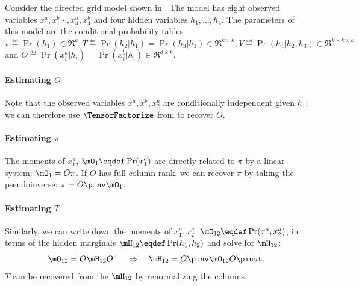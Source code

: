 Consider the directed grid model shown in .
The model has eight observed variables $x^a_1, x^b_1 \cdots, x^a_4, x^b_4$ and four
  hidden variables $h_1, \ldots, h_4$.
The parameters of this model are the conditional probability tables
$\pi \eqdef \Pr(h_1) \in \Re^k, T \eqdef \Pr(h_2 | h_1) = \Pr(h_3 | h_1) \in \Re^{k \times k},
V \eqdef \Pr(h_4 | h_2, h_3) \in \Re^{k \times k \times k}$ and $O \eqdef \Pr(x^a_i | h_i)
=  \Pr(x^b_i | h_i) \in \Re^{d \times k}$. 

\paragraph{Estimating $O$}
Note that the observed variables $x^a_1, x^b_1, x^a_2$ are
  conditionally independent given $h_1$; we can therefore use
  $\TensorFactorize$ from  to recover $O$.

\paragraph{Estimating $\pi$}
The moments of $x^a_1$, $\mO_1 \eqdef \Pr(x^a_1)$ are directly related to
  $\pi$ by a linear system: $\mO_1 = O \pi$. 
If $O$ has full column rank, we can recover $\pi$ by taking the pseudoinverse: $\pi = O\pinv  \mO_1$.

\paragraph{Estimating $T$}
Similarly, we can write down the moments of $x^a_1, x^a_2$, $\mO_{12}
  \eqdef \Pr(x^a_1, x^a_2)$, in terms of the hidden marginals $\mH_{12}
  \eqdef \Pr(h_1, h_2)$ and solve for $\mH_{12}$:
\begin{align*}
\mO_{12} = O \mH_{12} O^\top \quad\Rightarrow\quad
  \mH_{12} = O\pinv  \mO_{12} O\pinvt .
\end{align*}
$T$ can be recovered from the $\mH_{12}$ by renormalizing the columns.


